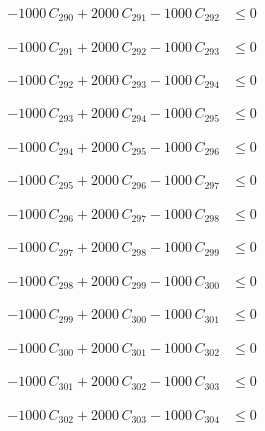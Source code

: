 \documentclass[a4paper,11pt]{article}
\begin{document}
\begin{align}
-1000\,C_{290} + 2000\,C_{291} - 1000\,C_{292} &\leq 0 \nonumber
\end{align}

\begin{align}
-1000\,C_{291} + 2000\,C_{292} - 1000\,C_{293} &\leq 0 \nonumber
\end{align}

\begin{align}
-1000\,C_{292} + 2000\,C_{293} - 1000\,C_{294} &\leq 0 \nonumber
\end{align}

\begin{align}
-1000\,C_{293} + 2000\,C_{294} - 1000\,C_{295} &\leq 0 \nonumber
\end{align}

\begin{align}
-1000\,C_{294} + 2000\,C_{295} - 1000\,C_{296} &\leq 0 \nonumber
\end{align}

\begin{align}
-1000\,C_{295} + 2000\,C_{296} - 1000\,C_{297} &\leq 0 \nonumber
\end{align}

\begin{align}
-1000\,C_{296} + 2000\,C_{297} - 1000\,C_{298} &\leq 0 \nonumber
\end{align}

\begin{align}
-1000\,C_{297} + 2000\,C_{298} - 1000\,C_{299} &\leq 0 \nonumber
\end{align}

\begin{align}
-1000\,C_{298} + 2000\,C_{299} - 1000\,C_{300} &\leq 0 \nonumber
\end{align}

\begin{align}
-1000\,C_{299} + 2000\,C_{300} - 1000\,C_{301} &\leq 0 \nonumber
\end{align}

\begin{align}
-1000\,C_{300} + 2000\,C_{301} - 1000\,C_{302} &\leq 0 \nonumber
\end{align}

\begin{align}
-1000\,C_{301} + 2000\,C_{302} - 1000\,C_{303} &\leq 0 \nonumber
\end{align}

\begin{align}
-1000\,C_{302} + 2000\,C_{303} - 1000\,C_{304} &\leq 0 \nonumber
\end{align}
\end{document}
